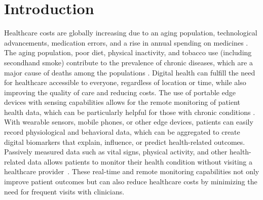 \section{Introduction}
\label{sec:introduction}

Healthcare costs are globally increasing due to an aging population, technological advancements, medication errors, and a rise in annual spending on medicines  \cite{fries_james_f_reducing_1993, bodenheimer_high_2005}. The aging population, poor diet, physical inactivity, and tobacco use (including secondhand smoke) \cite{cdc_chronic_2022} contribute to the prevalence of chronic diseases, which are a major cause of deaths among the populations \cite{huzooree_pervasive_2019}. Digital health \cite{varshney_mobile_2014} can fulfill the need for healthcare accessible to everyone, regardless of location or time, while also improving the quality of care and reducing costs. The use of portable edge devices with sensing capabilities allows for the remote monitoring of patient health data, which can be particularly helpful for those with chronic conditions \cite{javaid_sensors_2021}. With wearable sensors, mobile phones, or other edge devices, patients can easily record physiological and behavioral data, which can be aggregated to create digital biomarkers that explain, influence, or predict health-related outcomes. Passively measured data such as vital signs, physical activity, and other health-related data allows patients to monitor their health condition without visiting a healthcare provider~\cite{coravos_developing_2019}. These real-time and remote monitoring capabilities not only improve patient outcomes but can also reduce healthcare costs by minimizing the need for frequent visits with clinicians.

